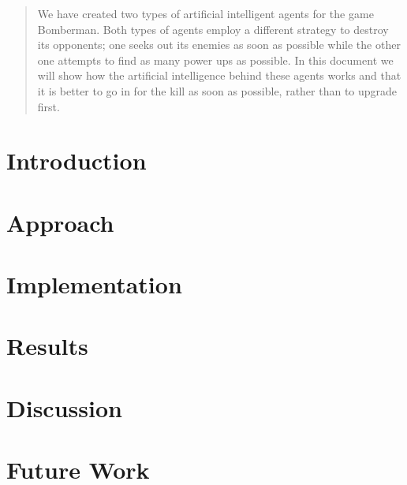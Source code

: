 \documentclass[a4paper, 11pt]{article}
\begin{document}

\newpage

\newpage
{}
\vspace*{-2cm}
\tableofcontents

\newpage

\begin{abstract}
We have created two types of artificial intelligent agents for the game
Bomberman. Both types of agents employ a different strategy to destroy
its opponents; one seeks out its enemies as soon as possible while the other
one attempts to find as many power ups as possible. In this document we will
show how the artificial intelligence behind these agents works and that it
is better to go in for the kill as soon as possible, rather than to upgrade
first.
\end{abstract}

\section{Introduction}


%

\section{Approach}


\section{Implementation}
\label{sec:implementation}


%

\section{Results}


\section{Discussion}


\section{Future Work}


\newpage



%
\end{document}
